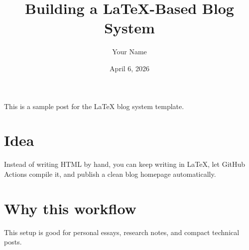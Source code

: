\documentclass[12pt]{article}
\title{Building a LaTeX-Based Blog System}
\author{Your Name}
\date{April 6, 2026}
\begin{document}
\maketitle

This is a sample post for the LaTeX blog system template.

\section*{Idea}
Instead of writing HTML by hand, you can keep writing in \LaTeX, let GitHub Actions compile it, and publish a clean blog homepage automatically.

\section*{Why this workflow}
This setup is good for personal essays, research notes, and compact technical posts.
\end{document}
